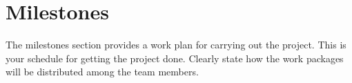 \documentclass{report}
\begin{document}
\section{Milestones}
The milestones section provides a work plan for carrying out the project.
This is your schedule for getting the project done.
Clearly state how the work packages will be distributed among the team members. 


\end{document}
